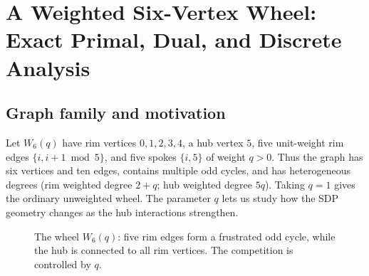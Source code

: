 \chapter{A Weighted Six-Vertex Wheel: Exact Primal, Dual, and Discrete Analysis}\label{ch:wheel6}
\section{Graph family and motivation}
Let $W_6(q)$ have rim vertices $0,1,2,3,4$, a hub vertex $5$, five unit-weight rim edges $\{i,i+1\bmod5\}$, and five spokes $\{i,5\}$ of weight $q>0$. Thus the graph has six vertices and ten edges, contains multiple odd cycles, and has heterogeneous degrees (rim weighted degree $2+q$; hub weighted degree $5q$). Taking $q=1$ gives the ordinary unweighted wheel. The parameter $q$ lets us study how the SDP geometry changes as the hub interactions strengthen.

\begin{figure}[ht]
\centering
{}
\caption{The wheel $W_6(q)$: five rim edges form a frustrated odd cycle, while the hub is connected to all rim vertices. The competition is controlled by $q$.}\label{fig:wheel}
\end{figure}

